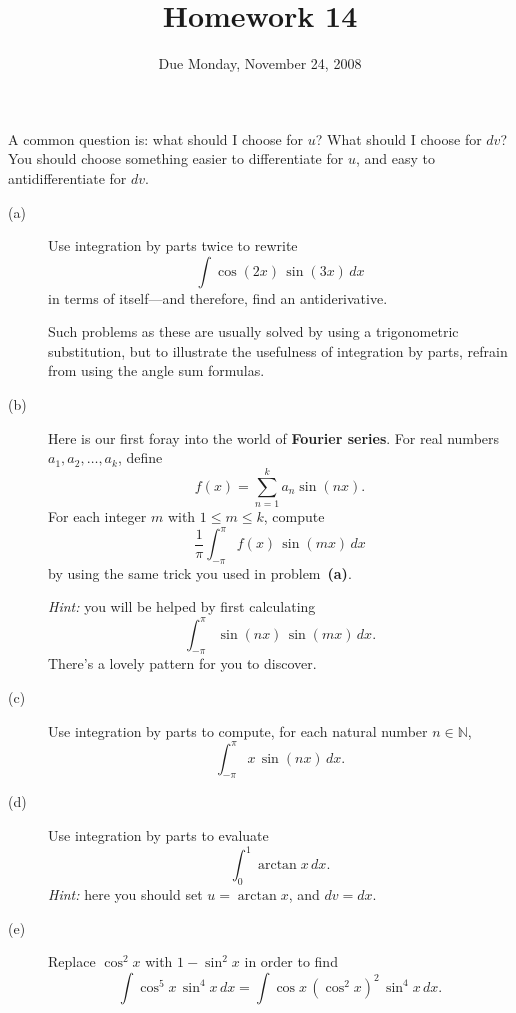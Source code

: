 \documentclass[12pt]{article}
\title{Homework 14}
\date{Due Monday, November 24, 2008}
\newcommand{\N}{\mathbb{N}}
\begin{document}
\maketitle

\begin{center}
  A common question is: what should I choose for $u$?  What should I
  choose for $dv$?  You should choose something easier to
  differentiate for $u$, and easy to antidifferentiate for $dv$.
\end{center}

\begin{description}

\item[(a)] Use integration by parts twice to rewrite 
$$
\int \cos (2x) \, \sin (3x) \, dx
$$
in terms of itself---and therefore, find an antiderivative.

Such problems as these are usually solved by using a trigonometric
substitution, but to illustrate the usefulness of integration by
parts, refrain from using the angle sum formulas.

\vfill

\item[(b)] Here is our first foray into the world of \textbf{Fourier
    series}.  For real numbers $a_1, a_2, \ldots, a_k$, define
$$
f(x) = \sum_{n=1}^k a_n \sin (nx).
$$
For each integer $m$ with $1 \leq m \leq k$, compute
$$
\frac{1}{\pi} \int_{-\pi}^\pi f(x) \, \sin (mx) \, dx
$$
by using the same trick you used in problem~\textbf{(a)}.

\textit{Hint:} you will be helped by first calculating
$$
\int_{-\pi}^\pi \sin (nx) \, \sin (mx) \, dx.
$$
There's a lovely pattern for you to discover.

\vfill

\item[(c)] Use integration by parts to compute, for each natural
  number $n \in \N$,
$$
\int_{-\pi}^\pi x \, \sin (nx) \, dx.
$$

\vfill

\item[(d)] Use integration by parts to evaluate
$$
\int_0^1 \arctan x \, dx.
$$
\textit{Hint:} here you should set $u = \arctan x$, and $dv = dx$.

\vfill

\item[(e)] Replace $\cos^2 x$ with $1 - \sin^2 x$ in order to find
$$
\int \cos^5 x \, \sin^4 x \, dx = \int \cos x \, \left( \cos^2 x \right)^2 \, \sin^4 x \, dx.
$$

\vfill

\end{description}
\end{document}
